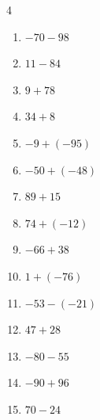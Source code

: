 \begin{multicols}{4}
\begin{enumerate}
        \phantom{$=-34$}

  \item $-70-98$

        \phantom{$=-168$}

  \item $11-84$

        \phantom{$=-73$}

  \item $9+78$

        \phantom{$=87$}

  \item $34+8$

        \phantom{$=42$}

  \item $-9+(-95)$

        \phantom{$=-104$}

  \item $-50+(-48)$

        \phantom{$=-98$}

  \item $89+15$

        \phantom{$=104$}

  \item $74+(-12)$

        \phantom{$=62$}

  \item $-66+38$

        \phantom{$=-28$}

  \item $1+(-76)$

        \phantom{$=-75$}

  \item $-53-(-21)$

        \phantom{$=-32$}

  \item $47+28$

        \phantom{$=75$}

  \item $-80-55$

        \phantom{$=-135$}

  \item $-90+96$

        \phantom{$=6$}

\columnbreak %

\resetques

  \item $70-24$

        \phantom{$=46$}


\end{enumerate}
\end{multicols}
